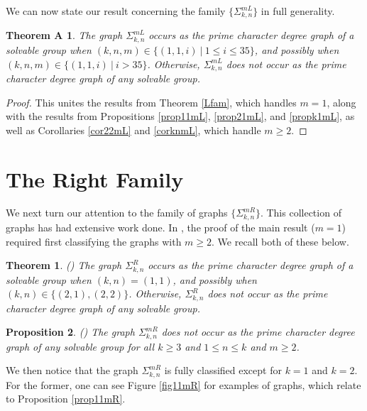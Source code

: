 \documentclass[11pt]{amsart}
\newtheorem{theorem}{Theorem}[section]
\newtheorem{proposition}[theorem]{Proposition}
\newtheorem*{thmA}{Theorem A}
\theoremstyle{definition}
\theoremstyle{remark}
\numberwithin{equation}{section}
\newcommand{\SR}[2]{\Sigma_{#1,#2}^R} %
\newcommand{\SLi}[3]{\Sigma_{#1,#2}^{#3L}} %
\newcommand{\SRi}[3]{\Sigma_{#1,#2}^{#3R}} %
\begin{document}
We can now state our result concerning the family $\{\SLi{k}{n}{m}\}$ in full generality.

\begin{thmA}
The graph $\SLi{k}{n}{m}$ occurs as the prime character degree graph of a solvable group when $(k,n,m)\in\{(1,1,i)~|~1\leq i\leq35\}$, and possibly when $(k,n,m)\in\{(1,1,i)~|~i>35\}$. Otherwise, $\SLi{k}{n}{m}$ does not occur as the prime character degree graph of any solvable group.
\end{thmA}
\begin{proof}
This unites the results from Theorem \ref{Lfam}, which handles $m=1$, along with the results from Propositions \ref{prop11mL}, \ref{prop21mL}, and \ref{propk1mL}, as well as Corollaries \ref{cor22mL} and \ref{corknmL}, which handle $m\geq2$.
\end{proof}


\section{The Right Family}\label{secright}


We next turn our attention to the family of graphs $\{\SRi{k}{n}{m}\}$. This collection of graphs has had extensive work done. In \cite{DLM}, the proof of the main result ($m=1$) required first classifying the graphs with $m\geq2$. We recall both of these below.

\begin{theorem}\label{Rfam}\emph{(\cite{DLM})}
The graph $\SR{k}{n}$ occurs as the prime character degree graph of a solvable group when $(k,n)=(1,1)$, and possibly when $(k,n)\in\{(2,1), (2,2)\}$. Otherwise, $\SR{k}{n}$ does not occur as the prime character degree graph of any solvable group.
\end{theorem}

\begin{proposition}\label{propknmR}\emph{(\cite{DLM})}
The graph $\SRi{k}{n}{m}$ does not occur as the prime character degree graph of any solvable group for all $k\geq3$ and $1\leq n\leq k$ and $m\geq2$.
\end{proposition}

We then notice that the graph $\SRi{k}{n}{m}$ is fully classified except for $k=1$ and $k=2$. For the former, one can see Figure \ref{fig11mR} for examples of graphs, which relate to Proposition \ref{prop11mR}.
\end{document}
